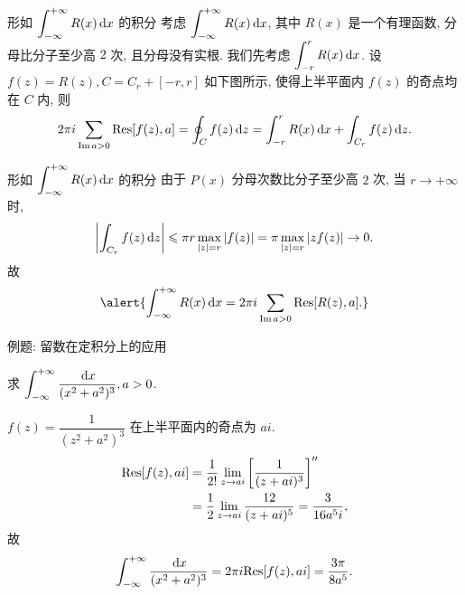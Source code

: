 \begin{frame}{形如 $\displaystyle\int_{-\infty}^{+\infty}R(x)\,\mathrm{d} x$ 的积分}
\onslide<+->
考虑 $\displaystyle\int_{-\infty}^{+\infty}R(x)\,\mathrm{d} x$, 其中 $R(x)$ 是一个有理函数, 分母比分子至少高 $2$ 次, 且分母没有实根.
\onslide<+->
我们先考虑 $\displaystyle\int_{-r}^rR(x)\,\mathrm{d} x$.
\onslide<+->
设 $f(z)=R(z),C=C_r+[-r,r]$ 如下图所示, 使得上半平面内 $f(z)$ 的奇点均在 $C$ 内,
\onslide<+->
则
\[2\pi i\sum_{\operatorname{Im} a>0}{\mathrm{Res}}[f(z),a]=\oint_Cf(z)\,\mathrm{d} z=\int_{-r}^rR(x)\,\mathrm{d} x+\int_{C_r}f(z)\,\mathrm{d} z.\]
\begin{center}
\end{center}
\end{frame}


\begin{frame}{形如 $\displaystyle\int_{-\infty}^{+\infty}R(x)\,\mathrm{d} x$ 的积分}
\onslide<+->
由于 $P(x)$ 分母次数比分子至少高 $2$ 次,
\onslide<+->
当 $r\to+\infty$ 时,
\[\left|\int_{C_r}f(z)\,\mathrm{d} z\right|\leqslant \pi r\max_{|z|=r}|f(z)|
=\pi \max_{|z|=r}|zf(z)|\to 0.\]
\onslide<+->
故
\[\alert{\int_{-\infty}^{+\infty}R(x)\diff x=2\pi i\sum_{\Im a>0}\Res[R(z),a].}\]
\end{frame}


\begin{frame}{例题: 留数在定积分上的应用}
\begin{example}
求 $\displaystyle\int_{-\infty}^{+\infty}\frac{\,\mathrm{d} x}{(x^2+a^2)^3},a>0$.
\end{example}

\begin{solution}
$f(z)=\dfrac1{(z^2+a^2)^3}$ 在上半平面内的奇点为 $ai$.
\vspace{-0.7\baselineskip}
\onslide<+->
\begin{align*}
{\mathrm{Res}}[f(z),ai]&=\frac1{2!}\lim_{z\to ai}\left[\frac1{(z+ai)^3}\right]''\\
&=\frac12\lim_{z\to ai}\frac{12}{(z+ai)^5}=\frac{3}{16a^5i},
\end{align*}
\onslide<+->
故
\[\int_{-\infty}^{+\infty}\frac{\,\mathrm{d} x}{(x^2+a^2)^3}
=2\pi i{\mathrm{Res}}[f(z),ai]=\frac{3\pi}{8a^5}.\]
\end{solution}
\end{frame}


